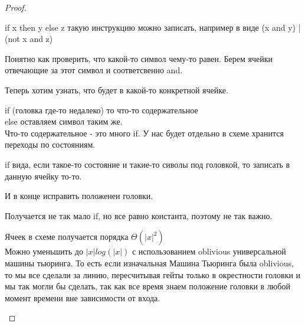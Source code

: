 \begin{proof}
\begin{description}
		if x then y else z такую инструкцию можно записать, например в виде
		(x and y) | (not x and z)

		Понятно как проверить, что какой-то символ чему-то равен. Берем ячейки отвечающие за этот 
		символ и соответсвенно and. 

		Теперь хотим узнать, что будет в какой-то конкретной ячейке. 

		if (головка где-то недалеко)
			то что-то содержательное\\
		else
			оставляем символ таким же.\\ 
		
		Что-то содержательное - это много if. У нас будет отдельно в схеме хранится переходы по 
		состояниям. 

		if вида, если такое-то состояние и такие-то сиволы под головкой, то записать в данную ячейку то-то.

	        И в конце исправить положенеи головки. 

	        Получается не так мало if, но все равно константа, поэтому не так важно. 

	        Ячеек в схеме получается порядка $\Theta(|x|^2)$\\
	 
	        Можно уменьшить до $|x|log(|x|)$ с использованием oblivious универсальной машины тьюринга.
	        То есть если изначальная Машина Тьюринга была oblivious, то мы все сделали за линию, 
	        пересчитывая гейты только в окрестности головки и мы так могли бы сделать, так как все время знаем
	        положение головки в любой момент времени вне зависимости от входа. 
	\end{description}
\end{proof}

